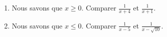 
\begin{exercice}\label{exosmath-0265}

    \begin{enumerate}
        \item
            Nous savons que \( x\geq 0\). Comparer \( \frac{1}{ x+4 }\) et \( \frac{1}{ x+1 }\).
        \item
            Nous savons que \( x\leq 0\). Comparer \( \frac{1}{ x-5 }\) et \( \frac{1}{ x-\sqrt{10} }\).
    \end{enumerate}
    

\end{exercice}
